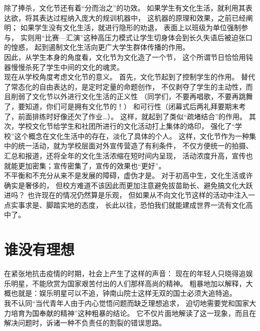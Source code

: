 \documentclass{article}
\begin{document}
    除了捧杀，文化节还有着“分而治之”的功效。
    如果学生有文化生活，就利用其表达欲，将其表达过程纳入庞大的规训机器中，
    这机器的原理和效果，之前已经阐明；
    如果学生没有文化生活，就进行隐形的劝退，
    表面上以班级为单位强制参与，
    实则用“比赛—汇演”这种高压力模式让学生切身体会到长久失语后被迫张口的惶惑，
    起到遏制文化生活向更广大学生群体传播的作用。\\

    因此，从学生本身的角度看，文化节为文化造了一个节，
    这个所谓节日恰恰用钝器慢慢杀死了学生中间的文化的魂灵。\\

    现在从学校角度考虑文化节的意义。
    首先，文化节起到了控制学生的作用。
    替代了常态化的自由表达的，是定时定量的命题创作，
    不仅剥夺了学生的主动性，而且削弱了文化节以外进行文化生活的正义性
    （同学们，不要再唱歌，不要再跳舞了，要知道，你们可是拥有文化节的！）
    和可行性（闭幕式后两礼拜要期末考了，前面排练时好像还欠了作业…）。
    这样，就起到了类似“疏堵结合”的作用。
    其次，学校文化节给学生和社团所进行的文化活动打上集体的烙印，
    强化了“学校”这个概念在文化生活中的存在，淡化了具体的个人。
    这样，文化节作为一种集中的统一活动，就为学校层面对外宣传营造了有利条件，
    不仅方便统一的拍摄、汇总和报道，还将全年的文化生活浓缩在短时间内呈现，
    活动浓度升高，宣传也就能更加密集；宣传密集了，宣传的效果也“更好”。\\

    不平衡和不充分从来不是发展的障碍，虚伪才是。
    对于初高中生，文化生活或许确实是奢侈的，
    但校方难道不该因此而更加注意避免拔苗助长、避免搞文化大跃进吗？
    也许现在的情况仍然算是乐观，
    但如果从不向文化节这样的活动中注入一点实事求是、脚踏实地的态度，
    长此以往，恐怕我们就能建成世界一流有文化高中了。\\

    \newpage
    
\section{谁没有理想}

在紧张地抗击疫情的时期，社会上产生了这样的声音：
现在的年轻人只晓得追娱乐明星，不能欣赏为国家艰苦付出的人们那样高尚的精神。
粗暴地加以解释，大概也就是：娱乐明星可以不追，钟南山院士这样无双的国士必须大追特追。\\

我不认同“当代青年人由于内心觉悟问题而缺乏理想追求，
迫切地需要党和国家大力培育为国奉献的精神”这种粗暴的结论。
它不仅片面地解读了这一现象，而且在解决问题时，诉诸一种不负责任的割裂的错误思路。\\
\end{document}
